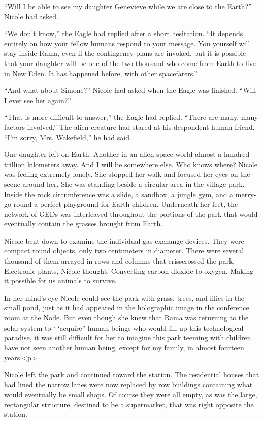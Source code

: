 \documentclass[]{article}
\begin{document}
{“Will I be able to see my daughter Genevieve while we are close to the Earth?” Nicole had asked.

“We don’t know,” the Eagle had replied after a short hesitation. “It depends entirely on how your fellow humans respond to your message. You yourself will stay inside Rama, even if the contingency plans are invoked, but it is possible that your daughter will be one of the two thousand who come from Earth to live in New Eden. It has happened before, with other spacefarers.”

“And what about Simone?” Nicole had asked when the Eagle was finished. “Will I ever see her again?”

“That is more difficult to answer,” the Eagle had replied. “There are many, many factors involved.” The alien creature had stared at his despondent human friend. “I’m sorry, Mrs. Wakefield,” he had said.

One daughter left on Earth. Another in an alien space world almost a hundred trillion kilometers away. And I will be somewhere else. Who knows where? Nicole was feeling extremely lonely. She stopped her walk and focused her eyes on the scene around her. She was standing beside a circular area in the village park. Inside the rock circumference was a slide, a sandbox, a jungle gym, and a merry-go-round-a perfect playground for Earth children. Underneath her feet, the network of GEDs was interleaved throughout the portions of the park that would eventually contain the grasses brought from Earth.

Nicole bent down to examine the individual gas exchange devices. They were compact round objects, only two centimeters in diameter. There were several thousand of them arrayed in rows and columns that crisscrossed the park. Electronic plants, Nicole thought. Converting carbon dioxide to oxygen. Making it possible for us animals to survive.

In her mind’s eye Nicole could see the park with grass, trees, and lilies in the small pond, just as it had appeared in the holographic image in the conference room at the Node. But even though she knew that Rama was returning to the solar system to ‘ ‘acquire” human beings who would fill up this technological paradise, it was still difficult for her to imagine this park teeming with children. have not seen another human being, except for my family, in almost fourteen years.<p>

Nicole left the park and continued toward the station. The residential houses that had lined the narrow lanes were now replaced by row buildings containing what would eventually be small shops. Of course they were all empty, as was the large, rectangular structure, destined to be a supermarket, that was right opposite the station.

}
\end{document}
